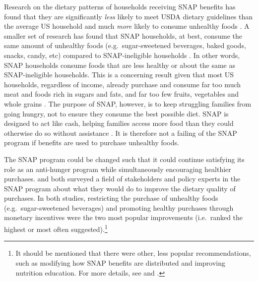 \documentclass[12pt,letterpaperpaper,]{book}
\begin{document}
Research on the dietary patterns of households receiving SNAP benefits
has found that they are significantly \emph{less} likely to meet USDA
dietary guidelines than the average US household and much \emph{more}
likely to consume unhealthy foods
\citep{andreyeva_dietary_2015, nguyen_supplemental_2015, wolfson_fruit_2015}.
A smaller set of research has found that SNAP households, at best,
consume the same amount of unhealthy foods (e.g.~sugar-sweetened
beverages, baked goods, snacks, candy, etc) compared to SNAP-ineligible
households \citep{todd_caloric_2014, hoynes_snap_2015}. In other words,
SNAP households consume foods that are less healthy or about the same as
SNAP-ineligible households. This is a concerning result given that most
US households, regardless of income, already purchase and consume far
too much meat and foods rich in sugars and fats, and far too few fruits,
vegetables and whole grains
\citep{usda_scientific_2015, frazao_high_1999}. The purpose of SNAP,
however, is to keep struggling families from going hungry, not to ensure
they consume the best possible diet. SNAP is designed to act like cash,
helping families access more food than they could otherwise do so
without assistance \citep{hoynes_snap_2015}. It is therefore not a
failing of the SNAP program if benefits are used to purchase unhealthy
foods.

The SNAP program could be changed such that it could continue satisfying
its role as an anti-hunger program while simultaneously encouraging
healthier purchases. \citet{blumenthal_strategies_2014} and
\citet{leung_qualitative_2013} both surveyed a field of stakeholders and
policy experts in the SNAP program about what they would do to improve
the dietary quality of purchases. In both studies, restricting the
purchase of unhealthy foods (e.g.~sugar-sweetened beverages) and
promoting healthy purchases through monetary incentives were the two
most popular improvements (i.e.~ranked the highest or most often
suggested).\footnote{It should be mentioned that there were other, less
  popular recommendations, such as modifying how SNAP benefits are
  distributed and improving nutrition education. For more details, see
  \citet{blumenthal_strategies_2014} and \citet{leung_qualitative_2013}.}
\end{document}
